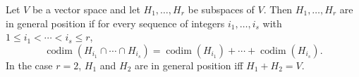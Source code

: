 Let $V$ be a vector space and let $H_1, \ldots, H_r$ be subspaces of $V$. Then $H_1, \ldots, H_r$ are in general position if for every sequence of integers $i_1, \ldots, i_s$ with $1 \leq i_1 < \cdots < i_s \leq r$,
$$\operatorname{codim}(H_{i_1} \cap \cdots \cap H_{i_s}) = \operatorname{codim}(H_{i_1}) + \cdots + \operatorname{codim}(H_{i_s}).$$
In the case $r = 2$, $H_1$ and $H_2$ are in general position iff $H_1 + H_2 = V$.
